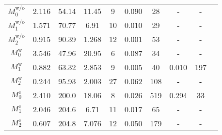 \begin{table}
\begin{tabularx}{1.1\textwidth}{cCCccccccc}
			$M_0^\mathrm{w/o}$&  2.116 &  54.14&    11.45&   9 & 0.090&  28&-&-\\
			$M_1^\mathrm{w/o}$& 1.571&   70.77&     6.91&  10 &0.010   &   29& -&-\\
			$M_2^\mathrm{w/o}$ &  0.915 &  90.39 &   1.268 & 12&0.001 & 53 & -&-\\ 
			
			\midrule
			
			
			$M_0^\mathrm{w}$& 3.546&   47.96&   20.95 &  6 &0.087&  34&     -&-\\
			$M_1^\mathrm{w}$& 0.882 &  63.32 &  2.853 &  9&0.005&  40 & 0.010&197\\
			$M_2^\mathrm{w}$ & 0.244&   95.93&   2.003&  27& 0.062 &  108    & -&-\\ 
			
			\midrule
			
			
		$M_0^\mathrm{c}$& 2.410&  200.0&   18.06&  8&0.026&   519  & 0.294&33\\
		$M_1^\mathrm{c}$& 2.046&   204.6&   6.71&  11 &0.017&   65&    -&-\\
		$M_2^\mathrm{c}$ & 0.607&   204.8&   7.076 &  12&0.050&  179    & -&-\\
			
		\bottomrule
	\end{tabularx}\label{tab:Arhenius}
\end{table}


\clearpage
